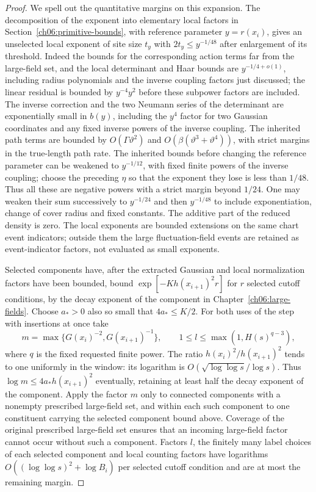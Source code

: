 \begin{proof}
We spell out the quantitative margins on this expansion.
The decomposition of the exponent into elementary local factors in
Section~\ref{ch06:primitive-bounds}, with reference parameter
$y=r(x_i)$, gives an unselected local exponent of site size
$t_y$ with $2t_y\le y^{-1/48}$ after enlargement of its threshold.
Indeed the bounds for the corresponding action terms far from the large-field set, and the local determinant and Haar
bounds are $y^{-1/4+o(1)}$, including radius polynomials and the
inverse coupling factors just discussed; the linear residual is
bounded by $y^{-4}y^2$ before these subpower factors are included. The
inverse correction and the two Neumann series of the determinant are exponentially
small in $b(y)$, including the $y^4$ factor for two Gaussian
coordinates and any fixed inverse powers of the inverse coupling. The inherited path
terms are bounded by $O(\Gamma\vartheta^2)$ and
$O(\beta(\vartheta^3+\vartheta^4))$, with strict margins in the true-length path rate.
The inherited bounds before changing the reference parameter can be weakened to
$y^{-1/12}$, with fixed finite powers of the inverse coupling;
choose the preceding $\eta$ so that the exponent they lose is less than $1/48$.
Thus all these are negative powers with a strict margin beyond
$1/24$. One may weaken their sum successively to $y^{-1/24}$
and then $y^{-1/48}$
to include exponentiation, change of cover radius and fixed constants.
The additive part of the reduced density is zero. The local exponents are bounded
extensions on the same chart event indicators; outside them the large fluctuation-field events
are retained as event-indicator factors, not evaluated as small exponents.

Selected components have, after the extracted Gaussian and local
normalization factors have been bounded, bound
$\exp[-K h(x_{i+1})^2 r]$ for $r$ selected cutoff conditions, by the decay
exponent of the component in Chapter~\ref{ch06:large-fields}. Choose
$a_*>0$ also so small that $4a_*\le K/2$.
For both uses of the step with insertions at once take
\[
 m=\max\{G(x_i)^{-2},G(x_{i+1})^{-1}\},\qquad
                 1\le l\le\max(1,H(s)^{q-3}),
\]
where $q$ is the fixed requested finite power.
The ratio $h(x_i)^2/h(x_{i+1})^2$ tends to one uniformly in the
window: its logarithm is $O(\sqrt{\log\log s}/\log s)$.
Thus $\log m\le4a_*h(x_{i+1})^2$ eventually, retaining at least
half the decay exponent of the component. Apply the factor $m$ only to connected components with a nonempty prescribed
large-field set, and within each such component to one constituent carrying the selected component bound above.
Coverage of the original prescribed large-field set ensures that an
incoming large-field factor cannot occur without such a component.
Factors $l$, the finitely many label choices of each selected component and local counting factors have
logarithms $O((\log\log s)^2+\log B_i)$ per selected cutoff condition and are
at most the remaining margin.


\end{proof}

